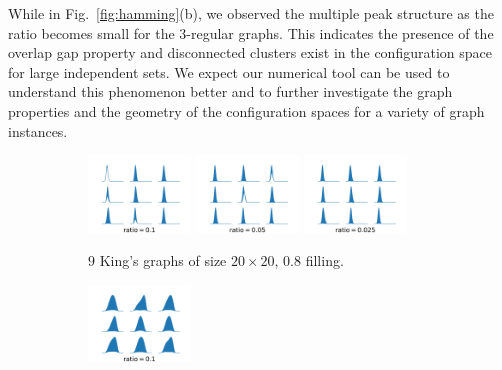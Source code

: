 \documentclass[onefignum, onetabnum]{siamart190516}
\newcommand{\<}{\langle}
\renewcommand{\>}{\rangle}
\newcommand{\Fig}[1]{Fig.~\ref{#1}}
\begin{document}
While in \Fig{fig:hamming}(b), we observed the multiple peak structure as the ratio becomes small for the $3$-regular graphs.
This indicates the presence of the overlap gap property and disconnected clusters exist in the configuration space for large independent sets.
We expect our numerical tool can be used to understand this phenomenon better and to further investigate the graph properties and the geometry of the configuration spaces for a variety of graph instances.
\begin{figure} 
    \begin{subfigure}[t]{\textwidth}
        \centering
        \includegraphics[width=0.3\textwidth, trim={0.5cm 0cm 0.5cm 1cm}, clip]{figures/grid-diag-size20d3-k3-alpha0.1-n10000.pdf}
        \includegraphics[width=0.3\textwidth, trim={0.5cm 0cm 0.5cm 1cm}, clip]{figures/grid-diag-size20d3-k3-alpha0.05-n10000.pdf}
        \includegraphics[width=0.3\textwidth, trim={0.5cm 0cm 0.5cm 1cm}, clip]{figures/grid-diag-size20d3-k3-alpha0.025-n10000.pdf}
        \caption{$9$ King's graphs of size $20\times 20$, $0.8$ filling.}
    \end{subfigure}
    \begin{subfigure}[t]{\textwidth}
        \centering
        \includegraphics[width=0.3\textwidth, trim={0.5cm 0cm 0.5cm 1cm}, clip]{figures/grid-regular-size110d3-k3-alpha0.1-n10000.pdf}

\end{subfigure}
\end{figure}
\end{document}
